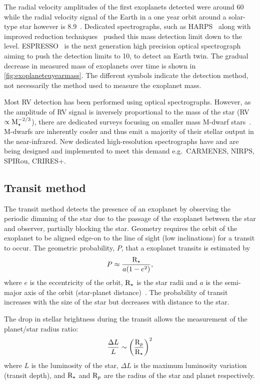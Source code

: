 The radial velocity amplitudes of the first exoplanets detected were around 60\mps{} while
the radial velocity signal of the Earth in a one year orbit around a solar-type star however is 8.9\cmps{}~\citep[e.g.][]{figueira_radial_2010}.
Dedicated spectrographs, such as HARPS~\citep{mayor_setting_2003} along with improved reduction techniques~\citep{lovis_new_2007} pushed this mass detection limit down to the \mps{} level.
ESPRESSO~\citep{pepe_espresso_2014, megevand_espresso_2014} is the next generation high precision optical spectrograph aiming to push the detection limits to 10\cmps, to detect an Earth twin.
The gradual decrease in measured mass of exoplanets over time is shown in \cref{fig:exoplaneteuyearmass}.
The different symbols indicate the detection method, not necessarily the method used to measure the exoplanet mass.

Most {RV} detection has been performed using optical spectrographs.
However, as the amplitude of {RV} signal is inversely proportional to the mass of the star ({RV} $\propto \textrm{M}_{\star}^{-2/3}$), there are dedicated surveys focusing on smaller mass {M-dwarf} stars~\citep[e.g.][]{reiners_carmenes_2018}.
M-dwarfs are inherently cooler and thus emit a majority of their stellar output in the near-infrared.
New dedicated high-resolution \nir{} spectrographs have and are being designed and implemented to meet this demand e.g.\ {CARMENES}, {NIRPS}, {SPIRou}, {CRIRES+}.


\subsection{Transit method}
\label{subsec:transit}
The transit method detects the presence of an exoplanet by observing the periodic dimming of the star due to the passage of the exoplanet between the star and observer, partially blocking the star.
Geometry requires the orbit of the exoplanet to be aligned edge-on to the line of sight (low inclinations) for a transit to occur.
The geometric probability, \(P\), that a exoplanet transits is estimated by
\begin{equation}
P \approx \frac{\textrm{R}_{\star}}{a (1-{e}^{2})},
\end{equation}
where \(e\) is the eccentricity of the orbit, $\textrm{R}_{\star}$ is the star radii and \(a\) is the semi-major axis of the orbit (star-planet distance)~\citep[e.g.][]{barnes_effects_2007}.
The probability of transit increases with the size of the star but decreases with distance to the star.

The drop in stellar brightness during the transit allows the measurement of the planet/star radius ratio:
\begin{equation}
    \frac{\Delta L}{L}\sim{\left(\frac{\textrm{R}_{p}}{\textrm{R}_{\star}}\right)}^{2}
\end{equation}
where \(L\) is the luminosity of the star, \(\Delta L\) is the maximum luminosity variation (transit depth), and \(\textrm{R}_{\star}\) and \(\textrm{R}_{p}\) are the radius of the star and planet respectively.

